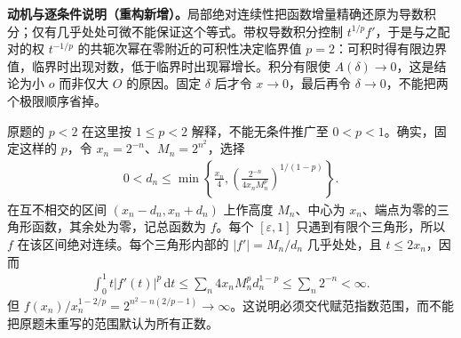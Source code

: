 \documentclass[../../main.tex]{subfiles}
\begin{document}
\begin{remark}
\textbf{动机与逐条件说明（重构新增）。}局部绝对连续性把函数增量精确还原为导数积分；仅有几乎处处可微不能保证这个等式。带权导数积分控制 $t^{1/p}f'$，于是与之配对的权 $t^{-1/p}$ 的共轭次幂在零附近的可积性决定临界值 $p=2$：可积时得有限边界值，临界时出现对数，低于临界时出现幂增长。积分有限使 $A(\delta)\to0$，这是结论为小 $o$ 而非仅大 $O$ 的原因。固定 $\delta$ 后才令 $x\to0$，最后再令 $\delta\to0$，不能把两个极限顺序省掉。

原题的 $p<2$ 在这里按 $1\leqslant p<2$ 解释，不能无条件推广至 $0<p<1$。确实，固定这样的 $p$，令 $x_n=2^{-n}$、$M_n=2^{n^2}$，选择
\begin{align*}
0<d_n\leqslant\min\left\{\frac{x_n}4,
\left(\frac{2^{-n}}{4x_nM_n^p}\right)^{1/(1-p)}\right\}.
\end{align*}
在互不相交的区间 $(x_n-d_n,x_n+d_n)$ 上作高度 $M_n$、中心为 $x_n$、端点为零的三角形函数，其余处为零，记总函数为 $f$。每个 $[\varepsilon,1]$ 只遇到有限个三角形，所以 $f$ 在该区间绝对连续。每个三角形内部的 $|f'|=M_n/d_n$ 几乎处处，且 $t\leqslant2x_n$，因而
\begin{align*}
\int_0^1t|f'(t)|^p\,\mathrm dt
\leqslant\sum_n4x_nM_n^pd_n^{1-p}\leqslant\sum_n2^{-n}<\infty.
\end{align*}
但 $f(x_n)/x_n^{1-2/p}=2^{n^2-n(2/p-1)}\to\infty$。这说明必须交代赋范指数范围，而不能把原题未重写的范围默认为所有正数。
\end{remark}
\end{document}
